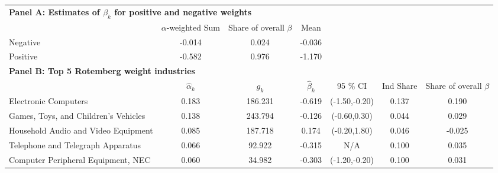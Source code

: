 \begin{landscape}\begin{table}\begin{tabular}{l cccccc}\toprule
\multicolumn{7}{l}{\textbf{Panel A: Estimates of $\beta_{k}$ for positive and negative weights} }\\
 & $\alpha$-weighted Sum & Share of overall $\beta$ & Mean & & & \\ \cmidrule(lr){2-3}
 Negative & -0.014 & 0.024 &-0.036 & & &\\
 Positive & -0.582 & 0.976 & -1.170 & & &\\
\multicolumn{7}{l}{\textbf{Panel B: Top 5 Rotemberg weight industries} }\\
 & $\hat{\alpha}_{k}$ & $g_{k}$ & $\hat{\beta}_{k}$ & 95 \% CI & Ind Share & Share of overall $\beta$ \\ \cmidrule(lr){2-6}
Electronic Computers & 0.183 & 186.231 & -0.619 & (-1.50,-0.20)  & 0.137 & 0.190 \\ 
Games, Toys, and Children's Vehicles & 0.138 & 243.794 & -0.126 & (-0.60,0.30)  & 0.044 & 0.029 \\ 
Household Audio and Video Equipment & 0.085 & 187.718 & 0.174 & (-0.20,1.80)  & 0.046 & -0.025 \\ 
Telephone and Telegraph Apparatus & 0.066 & 92.922 & -0.315 & \multicolumn{1}{c}{N/A}  & 0.100 & 0.035 \\ 
Computer Peripheral Equipment, NEC & 0.060 & 34.982 & -0.303 & (-1.20,-0.20)  & 0.100 & 0.031 \\ 
\bottomrule
\end{tabular}\end{table}\end{landscape}